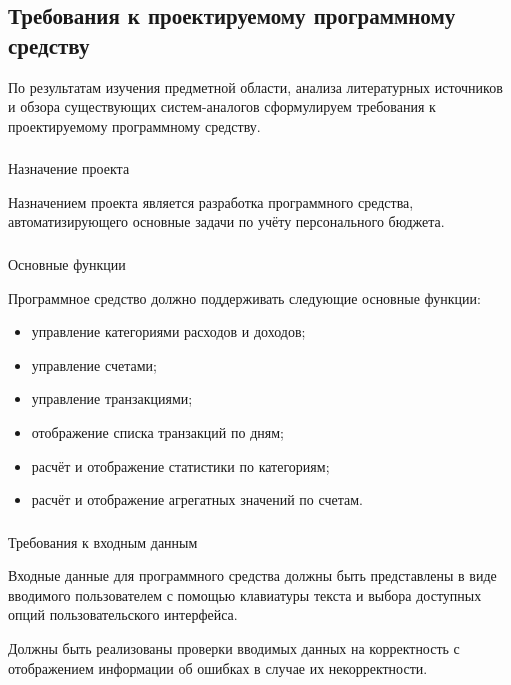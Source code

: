 \subsection{Требования к проектируемому программному средству}
\label{sec:analysis:specification}

По результатам изучения предметной области, анализа литературных источников и обзора существующих систем-аналогов сформулируем требования к проектируемому программному средству.

\subsubsection{} Назначение проекта
\label{sec:analysis:specification:purpose}

Назначением проекта является разработка программного средства, автоматизирующего основные задачи по учёту персонального бюджета.

\subsubsection{} Основные функции
\label{sec:analysis:specification:functions}

Программное средство должно поддерживать следующие основные фун\-к\-ции:

\begin{itemize}
    \item управление категориями расходов и доходов;
    \item управление счетами;
    \item управление транзакциями;
    \item отображение списка транзакций по дням;
    \item расчёт и отображение статистики по категориям;
    \item расчёт и отображение агрегатных значений по счетам.
\end{itemize}

\subsubsection{} Требования к входным данным
\label{sec:analysis:specification:inputs}

Входные данные для программного средства должны быть представлены в виде вводимого пользователем с помощью клавиатуры текста и выбора доступных опций пользовательского интерфейса.

Должны быть реализованы проверки вводимых данных на корректность с отображением информации об ошибках в случае их некорректности.

